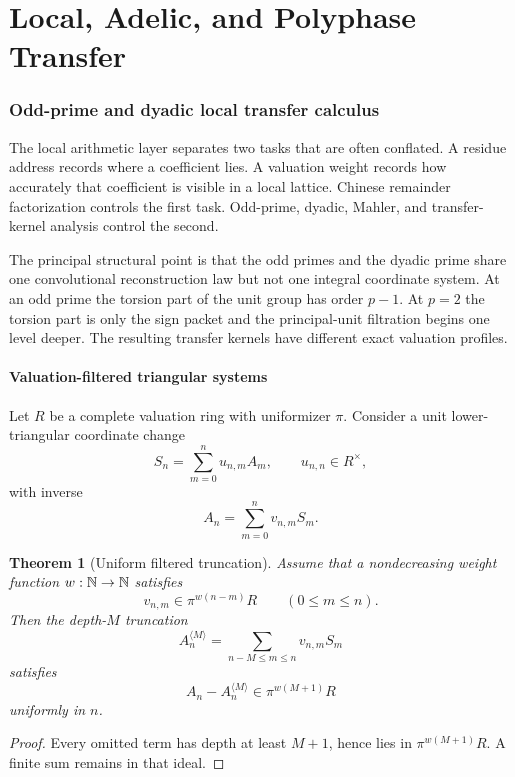 \documentclass[11pt]{article}
\newtheorem{theorem}{Theorem}[section]\newtheorem{proposition}[theorem]{Proposition}\newtheorem{lemma}[theorem]{Lemma}\newtheorem{corollary}[theorem]{Corollary}
\theoremstyle{definition}\newtheorem{definition}[theorem]{Definition}\newtheorem{example}[theorem]{Example}\newtheorem{construction}[theorem]{Construction}\newtheorem{algorithm}[theorem]{Algorithm}\newtheorem{conjecture}[theorem]{Conjecture}\newtheorem{problem}[theorem]{Problem}
\theoremstyle{remark}\newtheorem{remark}[theorem]{Remark}\newtheorem{boundary}[theorem]{Boundary}\newtheorem{certificate}[theorem]{Computational Certificate}\newtheorem{classical}[theorem]{Classical Input}\newtheorem{principle}[theorem]{Structural Principle}
\begin{document}

\part{Local, Adelic, and Polyphase Transfer}
\section{Odd-prime and dyadic local transfer calculus}

The local arithmetic layer separates two tasks that are often conflated. A residue address records where a coefficient lies. A valuation weight records how accurately that coefficient is visible in a local lattice. Chinese remainder factorization controls the first task. Odd-prime, dyadic, Mahler, and transfer-kernel analysis control the second.

The principal structural point is that the odd primes and the dyadic prime share one convolutional reconstruction law but not one integral coordinate system. At an odd prime the torsion part of the unit group has order $p-1$. At $p=2$ the torsion part is only the sign packet and the principal-unit filtration begins one level deeper. The resulting transfer kernels have different exact valuation profiles.

\subsection{Valuation-filtered triangular systems}
Let $R$ be a complete valuation ring with uniformizer $\pi$. Consider a unit lower-triangular coordinate change
\[
 S_n=\sum_{m=0}^{n}u_{n,m}A_m,
 \qquad u_{n,n}\in R^\times,
\]
with inverse
\[
 A_n=\sum_{m=0}^{n}v_{n,m}S_m.
\]

\begin{theorem}[Uniform filtered truncation]
Assume that a nondecreasing weight function $w:\mathbb N\to\mathbb N$ satisfies
\[
 v_{n,m}\in \pi^{w(n-m)}R
 \qquad(0\leq m\leq n).
\]
Then the depth-$M$ truncation
\[
 A_n^{\langle M\rangle}
 =\sum_{n-M\leq m\leq n}v_{n,m}S_m
\]
satisfies
\[
 \boxed{A_n-A_n^{\langle M\rangle}\in \pi^{w(M+1)}R}
\]
uniformly in $n$.
\end{theorem}

\begin{proof}
Every omitted term has depth at least $M+1$, hence lies in $\pi^{w(M+1)}R$. A finite sum remains in that ideal.
\end{proof}
\end{document}
